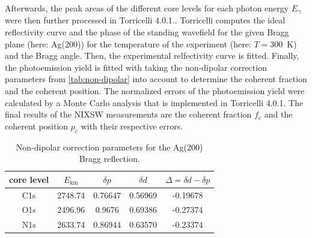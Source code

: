 Afterwards, the peak areas of the different core levels for each photon energy $E_\mathrm{\gamma}$ were then further processed in Torricelli 4.0.1.\autocite{Bocquet2019}. Torricelli computes the ideal reflectivity curve and the phase of the standing wavefield for the given Bragg plane (here: Ag(200)) for the temperature of the experiment (here: $T=300$~\si{K}) and the Bragg angle. Then, the experimental relfectivity curve is fitted. Finally, the photoemission yield is fitted with taking the non-dipolar correction parameters from \autoref{tab:non-dipolar} into account to determine the coherent fraction and the coherent position. The normalized errors of the photoemission yield were calculated by a Monte Carlo analysis that is implemented in Torricelli 4.0.1.\autocite{Bocquet2019} The final results of the \ac{NIXSW} measurements are the coherent fraction $f_\mathrm{c}$ and the coherent position $p_\mathrm{c}$ with their respective errors.

\begin{table}[htbp]
	\centering
	\caption{Non-dipolar correction parameters for the Ag(200) Bragg reflection.\autocite{Jablonski2010}}
	\begin{tabular}{@{}ccccc@{}} \toprule
		core level & $E_\mathrm{kin}$ & $\delta p$ & $\delta d$ & $\Delta = \delta d -\delta p$ \\
		\midrule
		C1s & 2748.74 & 0.76647 & 0.56969 & -0.19678 \\
		O1s & 2496.96 & 0.9676 & 0.69386 & -0.27374 \\
		N1s & 2633.74 & 0.86944 & 0.63570 & -0.23374 \\
		\bottomrule
	\end{tabular}
	\label{tab:non-dipolar}
\end{table}



\cleardoublepage
